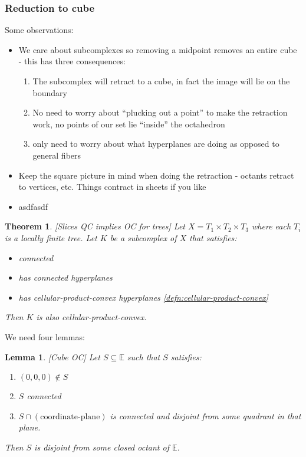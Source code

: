 \documentclass{article}
\theoremstyle{mystyle}
\newtheorem{thm}{Theorem}[section]
\newtheorem{lem}{Lemma}[section]
\theoremstyle{remark}
\begin{document}
\subsubsection{Reduction to cube}

Some observations:
\begin{itemize}
	\item We care about subcomplexes so removing a midpoint removes an entire cube - this has three consequences:
		\begin{enumerate}
			\item The subcomplex will retract to a cube, in fact the image will lie on the boundary
			\item No need to worry about ``plucking out a point'' to make the retraction work, no points of our set lie ``inside'' the octahedron
			\item only need to worry about what hyperplanes are doing as opposed to general fibers
		\end{enumerate}
	\item Keep the square picture in mind when doing the retraction - octants retract to vertices, etc. Things contract in sheets if you like
	\item asdfasdf
\end{itemize}

\begin{thm}
	\label{thm:QCOC}
    [Slices QC implies OC for trees]
	Let \(X=T_{1} \times T_{2} \times T_{3}\) where each \(T_{i}\) is a locally finite tree. Let \(K\) be a subcomplex of \(X\) that satisfies: 
	\begin{itemize}
		\item connected
		\item has connected hyperplanes
		\item has cellular-product-convex hyperplanes \ref{defn:cellular-product-convex}
	\end{itemize}
Then \(K\) is also cellular-product-convex.
\end{thm}
We need four lemmas:

\begin{lem}
	\label{lem:cubeOC}
	[Cube OC] Let \(S \subseteq \mathbb{E}  \) such that \(S\) satisfies: 
	\begin{enumerate}
		\item \((0,0,0) \not\in S\) 
		\item \(S\) connected
		\item \(S \cap (\text{coordinate-plane})\) is connected and disjoint from some quadrant in that plane.
	\end{enumerate}
	Then \(S\) is disjoint from some closed octant of \(\mathbb{E}\). 
\end{lem}
\end{document}
